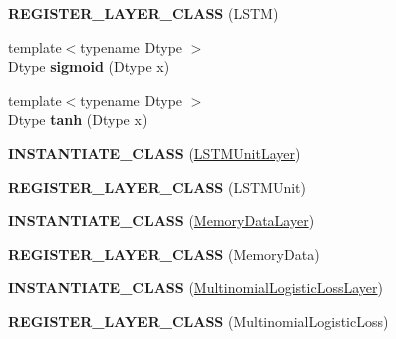 \begin{DoxyCompactItemize}
\item 
{\bfseries R\+E\+G\+I\+S\+T\+E\+R\+\_\+\+L\+A\+Y\+E\+R\+\_\+\+C\+L\+A\+SS} (L\+S\+TM)\hypertarget{namespacecaffe_a30dc42cdaffcb0943ab747752d70b1e8}{}\label{namespacecaffe_a30dc42cdaffcb0943ab747752d70b1e8}

\item 
{\footnotesize template$<$typename Dtype $>$ }\\Dtype {\bfseries sigmoid} (Dtype x)\hypertarget{namespacecaffe_a09950f2e1819d3f30dec69bbb8e404a1}{}\label{namespacecaffe_a09950f2e1819d3f30dec69bbb8e404a1}

\item 
{\footnotesize template$<$typename Dtype $>$ }\\Dtype {\bfseries tanh} (Dtype x)\hypertarget{namespacecaffe_a4b96feb770b70ba19a175541ff1b0a23}{}\label{namespacecaffe_a4b96feb770b70ba19a175541ff1b0a23}

\item 
{\bfseries I\+N\+S\+T\+A\+N\+T\+I\+A\+T\+E\+\_\+\+C\+L\+A\+SS} (\hyperlink{classcaffe_1_1LSTMUnitLayer}{L\+S\+T\+M\+Unit\+Layer})\hypertarget{namespacecaffe_a1ed3633b84db47c930043db15dec8214}{}\label{namespacecaffe_a1ed3633b84db47c930043db15dec8214}

\item 
{\bfseries R\+E\+G\+I\+S\+T\+E\+R\+\_\+\+L\+A\+Y\+E\+R\+\_\+\+C\+L\+A\+SS} (L\+S\+T\+M\+Unit)\hypertarget{namespacecaffe_af51f510e13834066bf5c15b170ddff38}{}\label{namespacecaffe_af51f510e13834066bf5c15b170ddff38}

\item 
{\bfseries I\+N\+S\+T\+A\+N\+T\+I\+A\+T\+E\+\_\+\+C\+L\+A\+SS} (\hyperlink{classcaffe_1_1MemoryDataLayer}{Memory\+Data\+Layer})\hypertarget{namespacecaffe_a760d67cbf4c0daf41b5ea8035455a295}{}\label{namespacecaffe_a760d67cbf4c0daf41b5ea8035455a295}

\item 
{\bfseries R\+E\+G\+I\+S\+T\+E\+R\+\_\+\+L\+A\+Y\+E\+R\+\_\+\+C\+L\+A\+SS} (Memory\+Data)\hypertarget{namespacecaffe_a16457f4e83fc72cb5b1a9ae47b7108fd}{}\label{namespacecaffe_a16457f4e83fc72cb5b1a9ae47b7108fd}

\item 
{\bfseries I\+N\+S\+T\+A\+N\+T\+I\+A\+T\+E\+\_\+\+C\+L\+A\+SS} (\hyperlink{classcaffe_1_1MultinomialLogisticLossLayer}{Multinomial\+Logistic\+Loss\+Layer})\hypertarget{namespacecaffe_a2b7ccb24cf58e7aa080107a7adb1635c}{}\label{namespacecaffe_a2b7ccb24cf58e7aa080107a7adb1635c}

\item 
{\bfseries R\+E\+G\+I\+S\+T\+E\+R\+\_\+\+L\+A\+Y\+E\+R\+\_\+\+C\+L\+A\+SS} (Multinomial\+Logistic\+Loss)\hypertarget{namespacecaffe_a7dc7bc19bf7f4b0054da48c61cf8a4c6}{}\label{namespacecaffe_a7dc7bc19bf7f4b0054da48c61cf8a4c6}


\end{DoxyCompactItemize}
